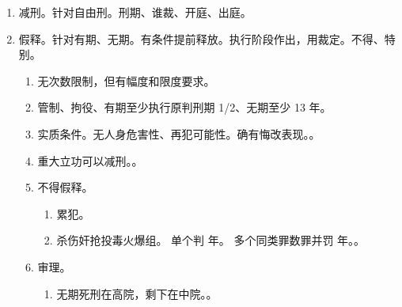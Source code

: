 \begin{enumerate}
\begin{enumerate}
\begin{enumerate}
                  \item 对象。拘役、有期、特殊的无期。。。省政府指定的医院。
                  \item {}。
                        \begin{enumerate}
                          \item 执行前。法院。
                          \item 执行后。监狱/看守所提书面意见 \yjt 省监狱管理机关/市以上公安批准。
                        \end{enumerate}
                  \item 收监。。
                  \item {}。
                \end{enumerate}
          \item 减刑。针对自由刑。刑期、谁裁、开庭、出庭。
          \item 假释。针对有期、无期。有条件提前释放。执行阶段作出，用裁定。不得、特别。
                \begin{enumerate}
                  \item 无次数限制，但有幅度和限度要求。
                  \item 管制、拘役、有期至少执行原判刑期 1/2、无期至少 13 年。
                  \item 实质条件。无人身危害性、再犯可能性。确有悔改表现。。
                  \item 重大立功可以减刑。。
                  \item 不得假释。
                        \begin{enumerate}
                          \item 累犯。
                          \item 杀伤奸抢投毒火爆组。
                                \yi 单个判  年。
                                \er 多个同类罪数罪并罚  年。。
                        \end{enumerate}
                  \item 审理。
                        \begin{enumerate}
                          \item 无期死刑在高院，剩下在中院。。

\end{enumerate}
\end{enumerate}
\end{enumerate}
\end{enumerate}
